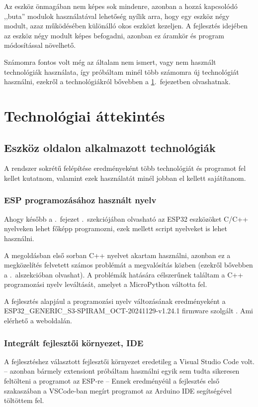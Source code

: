 \documentclass{thesis-ekf}
\theoremstyle{definition}
\theoremstyle{remark}
\begin{document}
	Az eszköz önmagában nem képes sok mindenre, azonban a hozzá kapcsolódó ,,buta'' modulok használatával lehetőség nyílik arra, hogy egy eszköz négy modult, azaz működésében különálló okos eszközt kezeljen.
	A fejlesztés idejében az eszköz négy modult képes befogadni, azonban ez áramkör és program módosítással növelhető.
	
	Számomra fontos volt még az általam nem ismert, vagy nem használt technológiák használata, így próbáltam minél több számomra új technológiát használni, ezekről a technológiákról bővebben a \ref{ch_tech}.~fejezetben olvashatnak.
	\chapter{Technológiai áttekintés}
	\label{ch_tech}
	\section{Eszköz oldalon alkalmazott technológiák}
	A rendszer sokrétű felépítése eredményeként több technológiát és programot fel kellet kutatnom, valamint ezek használatát minél jobban el kellett sajátítanom.
	\subsection{ESP programozásához használt nyelv}
	Ahogy később a .~fejezet .~szekciójában olvasható az ESP32 eszközöket C/C++ nyelveken lehet főképp programozni, ezek mellett script nyelveket is lehet használni.
	
	A megoldásban első sorban C++ nyelvet akartam használni, azonban ez a megközelítés felvetett számos problémát a megvalósítás közben (ezekről bővebben a .~alszekcióban olvashat). A problémák hatására célszerűnek találtam a C++ programozási nyelv leváltását, amelyet a MicroPython váltotta fel.
	
	A fejlesztés alapjául a programozási nyelv változásának eredményeként a  ESP32\_GENERIC\_S3-SPIRAM\_OCT-20241129-v1.24.1 firmware szolgált . Ami elérhető a \href{https://micropython.org/download/}{\color{blue}{MicroPython}} weboldalán.
	\subsection{Integrált fejlesztői környezet, IDE}
	\label{ssec_ide_esp}
	A fejlesztéshez választott fejlesztői környezet eredetileg a Visual Studio Code volt. -- azonban bármely extensiont próbáltam használni egyik sem tudta sikeresen feltölteni a programot az ESP-re -- Ennek eredményéül a fejlesztés első szakaszában a VSCode-ban megírt programot az Arduino IDE segítségével töltöttem fel.
	
\end{document}
